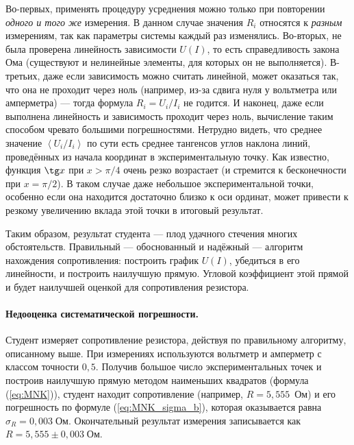 \enlargethispage{1em}

\begin{longnote}
    Во-первых, применять процедуру усреднения можно только
    при повторении \emph{одного и того же} измерения. В данном случае значения
$R_{i}$
    относятся к \emph{разным} измерениям, так как параметры системы каждый раз
изменялись.
    Во-вторых, не была проверена линейность зависимости $U\left(I\right)$, то
есть
    справедливость закона Ома (существуют и нелинейные элементы,
    для которых он не выполняется). В-третьих, даже если зависимость
    можно считать линейной, может оказаться так, что она не проходит через
    ноль (например, из-за сдвига нуля у вольтметра или амперметра) ---
    тогда формула $R_{i}=U_{i}/I_{i}$ не годится.
    И наконец, даже если выполнена линейность и зависимость проходит через
    ноль, вычисление таким способом чревато большими погрешностями. Нетрудно
    видеть, что среднее значение $\left\langle U_{i}/I_{i}\right\rangle $
    по сути есть среднее тангенсов углов наклона линий, проведённых из
    начала координат в экспериментальную точку. Как известно,
    функция $\tg x$ при $x>\pi/4$ очень резко возрастает (и стремится
    к бесконечности при $x=\pi/2$). В таком случае даже небольшое 
    экспериментальной точки, особенно если она находится достаточно близко
    к оси ординат, может привести к резкому увеличению вклада этой точки
    в итоговый результат.

    Таким образом,  результат студента --- плод удачного стечения
многих
    обстоятельств. Правильный --- обоснованный и надёжный --- алгоритм
    нахождения сопротивления: построить график $U\left(I\right)$, убедиться
    в его линейности, и построить наилучшую прямую. 
    Угловой коэффициент этой прямой и будет наилучшей оценкой 
    для сопротивления резистора.
\end{longnote}

\paragraph{Недооценка систематической погрешности.}
Студент измеряет сопротивление резистора, действуя по правильному
алгоритму, описанному выше. При измерениях используются вольтметр
и амперметр с классом точности $0{,}5$. Получив большое число экспериментальных
точек и построив наилучшую прямую методом наименьших квадратов (формула
(\ref{eq:MNK})), студент находит сопротивление (например, $R=5{,}555$~Ом)
и его погрешность по формуле (\ref{eq:MNK_sigma_b}), которая оказывается
равна $\sigma_{R}=0{,}003\;\text{Ом}.$ Окончательный результат измерения
записывается как $R=5{,}555\pm0{,}003\;\text{Ом}$.

